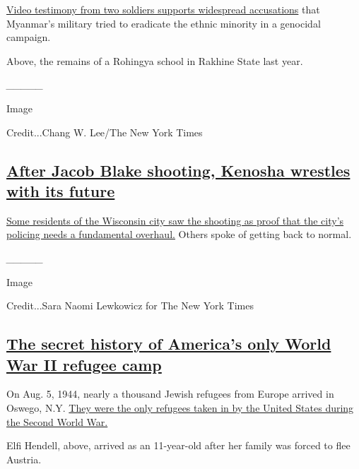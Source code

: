 \href{https://www.nytimes3xbfgragh.onion/2020/09/08/world/asia/myanmar-rohingya-genocide.html}{Video
testimony from two soldiers supports widespread accusations} that
Myanmar's military tried to eradicate the ethnic minority in a genocidal
campaign.

Above, the remains of a Rohingya school in Rakhine State last year.

\emph{\_\_\_\_\_}

Image

Credit...Chang W. Lee/The New York Times

\hypertarget{after-jacob-blake-shooting-kenosha-wrestles-with-its-future}{%
\subsection{\texorpdfstring{\href{https://www.nytimes3xbfgragh.onion/2020/09/06/us/kenosha-jacob-blake.html}{After
Jacob Blake shooting, Kenosha wrestles with its
future}}{After Jacob Blake shooting, Kenosha wrestles with its future}}\label{after-jacob-blake-shooting-kenosha-wrestles-with-its-future}}

\href{https://www.nytimes3xbfgragh.onion/2020/09/06/us/kenosha-jacob-blake.html}{Some
residents of the Wisconsin city saw the shooting as proof that the
city's policing needs a fundamental overhaul.} Others spoke of getting
back to normal.

\emph{\_\_\_\_\_}

Image

Credit...Sara Naomi Lewkowicz for The New York Times

\hypertarget{the-secret-history-of-americas-only-world-war-ii-refugee-camp}{%
\subsection{\texorpdfstring{\href{https://www.nytimes3xbfgragh.onion/2020/09/11/nyregion/oswego-jewish-refugees-world-war-two.html}{The
secret history of America's only World War II refugee
camp}}{The secret history of America's only World War II refugee camp}}\label{the-secret-history-of-americas-only-world-war-ii-refugee-camp}}

On Aug. 5, 1944, nearly a thousand Jewish refugees from Europe arrived
in Oswego, N.Y.
\href{https://www.nytimes3xbfgragh.onion/2020/09/11/nyregion/oswego-jewish-refugees-world-war-two.html}{They
were the only refugees taken in by the United States during the Second
World War.}

Elfi Hendell, above, arrived as an 11-year-old after her family was
forced to flee Austria.

